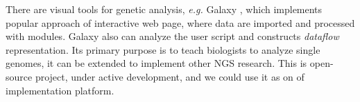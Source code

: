 \documentclass[a4paper]{jpconf}
\begin{document}

There are visual tools for genetic analysis, \emph{e.g.} Galaxy \cite{galaxy18}, which implements popular approach of interactive web page, where data are imported and processed with modules. Galaxy also can analyze the user script and constructs \emph{dataflow} representation. Its primary purpose is to teach biologists to analyze single genomes, it can be extended to implement other NGS research. This is open-source project, under active development, and we could use it as on of implementation platform. %
\end{document}

